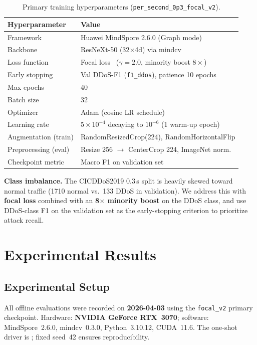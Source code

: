 \documentclass[conference]{IEEEtran}
\begin{document}
\begin{table}[htbp]
\centering
\caption{Primary training hyperparameters (\texttt{per\_second\_0p3\_focal\_v2}).}
\label{tab:hyper}
\renewcommand{\arraystretch}{1.1}
\begin{tabular}{@{}ll@{}}
\toprule
\textbf{Hyperparameter} & \textbf{Value} \\
\midrule
Framework         & Huawei MindSpore 2.6.0 (Graph mode) \\
Backbone          & ResNeXt-50 (32$\times$4d) via mindcv \\
Loss function     & Focal loss~\cite{lin2017focal} ($\gamma{=}2.0$, minority boost $8\times$) \\
Early stopping    & Val DDoS-F1 (\texttt{f1\_ddos}), patience 10 epochs \\
Max epochs        & 40 \\
Batch size        & 32 \\
Optimizer         & Adam (cosine LR schedule) \\
Learning rate     & $5{\times}10^{-4}$ decaying to $10^{-6}$ (1 warm-up epoch) \\
Augmentation (train) & RandomResizedCrop(224), RandomHorizontalFlip \\
Preprocessing (eval) & Resize 256 $\rightarrow$ CenterCrop 224, ImageNet norm. \\
Checkpoint metric & Macro F1 on validation set \\
\bottomrule
\end{tabular}
\end{table}

\textbf{Class imbalance.} The CICDDoS2019 0.3\,s split is heavily skewed toward
normal traffic (1710 normal vs.\ 133 DDoS in validation).
We address this with \textbf{focal loss} combined with an \textbf{8$\times$ minority
boost} on the DDoS class, and use DDoS-class F1 on the validation set as the
early-stopping criterion to prioritize attack recall.

\section{Experimental Results}
\label{sec:results}

\subsection{Experimental Setup}
All offline evaluations were recorded on \textbf{2026-04-03} using the
\texttt{focal\_v2} primary checkpoint.
Hardware: \textbf{NVIDIA GeForce RTX~3070};
software: MindSpore~2.6.0, mindcv~0.3.0, Python~3.10.12, CUDA~11.6.
The one-shot driver is ;
fixed seed~42 ensures reproducibility.
\end{document}
